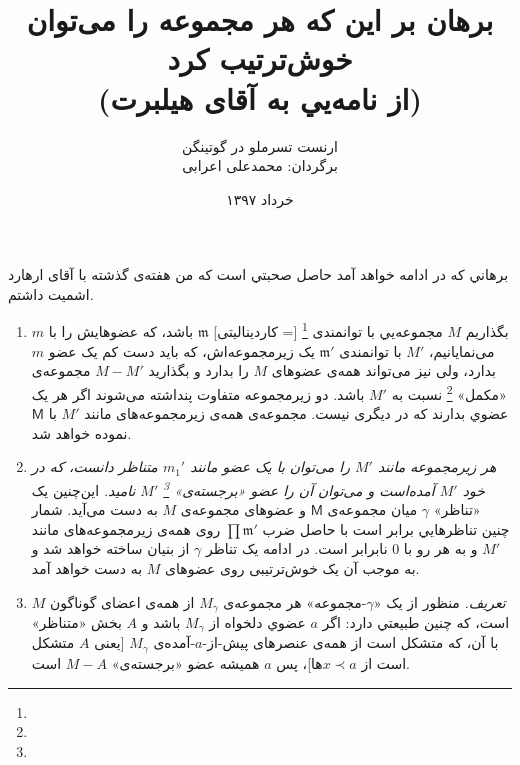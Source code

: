 \documentclass[11pt,a4paper,]{article}
\title{\textbf{برهان بر این که هر مجموعه را می‌توان خوش‌ترتیب کرد \\
(از نامه‌یي به آقای هیلبرت)}}
\author{ارنست تسرملو در گوتینگن \\ برگردان: محمدعلی اعرابی}
\date{خرداد ۱۳۹۷}
\begin{document}
\maketitle

برهاني که در ادامه خواهد آمد حاصل صحبتي است که من هفته‌ی گذشته با آقای ارهارد اشمیت داشتم.

\begin{enumerate}
\item 
بگذاریم 
$M$
مجموعه‌یي با توانمندی%
\footnote{}
[= کاردینالیتی]
$\mathfrak{m}$
باشد،
که عضوهایش را با
$m$
می‌نمایانیم،
$M'$
با توانمندی
$\mathfrak{m}'$
یک زیرمجموعه‌اش، 
که باید دست کم یک عضو
$m$
بدارد،
ولی نیز می‌تواند همه‌ی عضوهای
$M$
را بدارد
و بگذارید
$M - M'$
مجموعه‌ی «مکمل»%
\footnote{}
نسبت به 
$M'$
باشد.
دو زیرمجموعه متفاوت پنداشته می‌شوند
اگر هر یک عضوي بدارند که در دیگری نیست.
مجموعه‌ی همه‌ی زیرمجموعه‌های مانند
$M'$
با
$\mathsf{M}$
نموده خواهد شد.

\item
\textit{هر زیرمجموعه مانند 
$M'$
را می‌توان با یک عضو مانند
$m_1'$
متناظر دانست،
که در خود
$M'$
آمده‌است و می‌توان آن را عضو
«برجسته‌ی»%
\footnote{}
$M'$
نامید.}
این‌چنین یک «تناظر»
$\gamma$
میان مجموعه‌ی 
$\mathsf{M}$
و عضوهای مجموعه‌ی 
$M$
به دست می‌آید.
شمار چنین تناظرهایي برابر است با حاصل ضرب
$\prod \mathfrak{m}'$
روی همه‌ی زیرمجموعه‌های مانند
$M'$
و به هر رو با
$0$
نابرابر است.
در ادامه یک تناظر
$\gamma$
از بنیان ساخته خواهد شد و به موجب آن یک
خوش‌ترتیبی روی عضوهای 
$M$
به دست خواهد آمد.

\item
\textit{تعریف.}
منظور از یک
«$\gamma$-مجموعه»
هر مجموعه‌ی
$M_\gamma$
از همه‌ی اعضای گوناگون
$M$
است، که چنین طبیعتي دارد:
اگر
$a$
عضوي دلخواه از
$M_\gamma$
باشد و
$A$
بخش «متناظر» با آن، که متشکل است از همه‌ی عنصرهای 
پیش-از-$a$-آمده‌ی
$M_\gamma$
[یعنی $A$ متشکل است از $x \prec a$ها]،
پس
$a$
همیشه عضو «برجسته‌ی»
$M - A$
است.

\end{enumerate}
\end{document}
